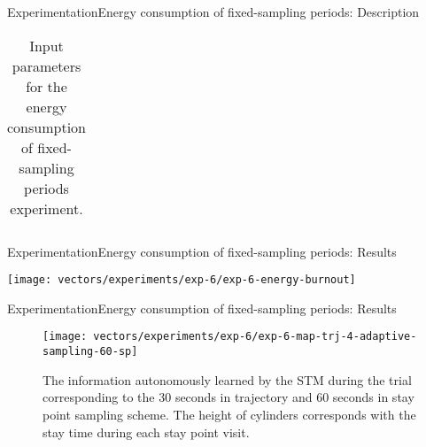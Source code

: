\begin{frame}{Experimentation}{Energy consumption of fixed-sampling periods: Description}
\begin{table}
{\begin{tabular}{@{}lll@{}}
\bottomrule
\end{tabular}%
}
\caption{Input parameters for the energy consumption of fixed-sampling periods experiment.}
\end{table}
\end{frame}

\begin{frame}{Experimentation}{Energy consumption of fixed-sampling periods: Results}
\vspace{-0.4cm}
{
  \centering
  \texttt{[image: vectors/experiments/exp-6/exp-6-energy-burnout]}
  \par
}
\end{frame}

\begin{frame}{Experimentation}{Energy consumption of fixed-sampling periods: Results}
\begin{figure}
  \texttt{[image: vectors/experiments/exp-6/exp-6-map-trj-4-adaptive-sampling-60-sp]}
  \caption{The information autonomously learned by the STM during the trial corresponding to the 30 seconds in trajectory and 60 seconds in stay point sampling scheme. The height of cylinders corresponds with the stay time during each stay point visit.}
  \label{fig:exp-6-stm-60-seconds-sp}
\end{figure}
\end{frame}


